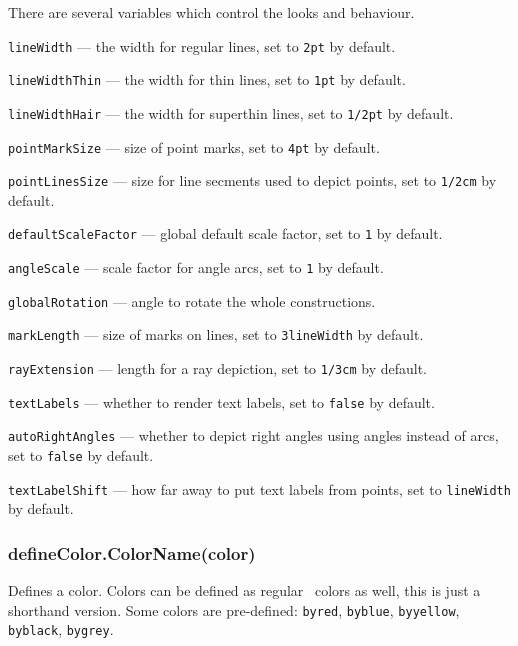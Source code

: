 \documentclass{ltxdoc}
\begin{document}
	There are several variables which control the looks and behaviour.
	
	\texttt{lineWidth} — the width for regular lines, set to \texttt{2pt} by default.
	
	\texttt{lineWidthThin} — the width for thin lines, set to \texttt{1pt} by default.
	
	\texttt{lineWidthHair} — the width for superthin lines, set to \texttt{1/2pt} by default.
	
	\texttt{pointMarkSize} — size of point marks, set to \texttt{4pt} by default.
	
	\texttt{pointLinesSize} — size for line secments used to depict points, set to \texttt{1/2cm} by default.

	\texttt{defaultScaleFactor} — global default scale factor, set to \texttt{1} by default.
	
	\texttt{angleScale} — scale factor for angle arcs, set to \texttt{1} by default.

	\texttt{globalRotation} — angle to rotate the whole constructions.

	\texttt{markLength} — size of marks on lines, set to \texttt{3lineWidth} by default.

	\texttt{rayExtension} — length for a ray depiction, set to \texttt{1/3cm} by default.

	
	\texttt{textLabels} — whether to render text labels, set to \texttt{false} by default.


	\texttt{autoRightAngles} — whether to depict right angles using angles instead of arcs, set to \texttt{false} by default.

	
	\texttt{textLabelShift} — how far away to put text labels from points, set to \texttt{lineWidth} by default.
	


\subsubsection{defineColor.ColorName(color)}
	
	Defines a color. Colors can be defined as regular \METAPOST\ colors as well, this is just a shorthand version. Some colors are pre-defined: \texttt{byred}, \texttt{byblue}, \texttt{byyellow}, \texttt{byblack}, \texttt{bygrey}.
\end{document}
